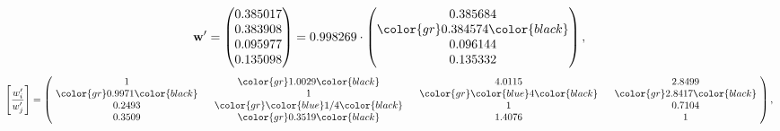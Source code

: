 \begin{example}
\begin{equation*}
\mathbf{w}^{\prime} =
\begin{pmatrix}
0.385017\\
0.383908\\
0.095977\\
0.135098
\end{pmatrix} =
0.998269\cdot
\begin{pmatrix}
0.385684\\
\color{gr} 0.384574\color{black} \\
0.096144\\
0.135332
\end{pmatrix},
\end{equation*}
\begin{equation*}
\left[ \frac{{w}^{\prime}_i}{{w}^{\prime}_j} \right] =
\begin{pmatrix}
$\,\,$ 1 $\,\,$ & $\,\,$\color{gr} 1.0029\color{black} $\,\,$ & $\,\,$4.0115$\,\,$ & $\,\,$2.8499$\,\,$ \\
$\,\,$\color{gr} 0.9971\color{black} $\,\,$ & $\,\,$ 1 $\,\,$ & $\,\,$\color{gr} \color{blue} 4\color{black} $\,\,$ & $\,\,$\color{gr} 2.8417\color{black}   $\,\,$ \\
$\,\,$0.2493$\,\,$ & $\,\,$\color{gr} \color{blue}  1/4\color{black} $\,\,$ & $\,\,$ 1 $\,\,$ & $\,\,$0.7104 $\,\,$ \\
$\,\,$0.3509$\,\,$ & $\,\,$\color{gr} 0.3519\color{black} $\,\,$ & $\,\,$1.4076$\,\,$ & $\,\,$ 1  $\,\,$ \\
\end{pmatrix},
\end{equation*}
\end{example}
\newpage
